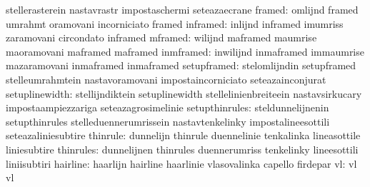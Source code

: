                                   stellerasterein                  nastavrastr
                                  impostaschermi                   seteazaecrane
                          framed: omlijnd                          framed
                                  umrahmt                          oramovani
                                  incorniciato                     framed
                        inframed: inlijnd                          inframed
                                  imumriss                         zaramovani
                                  circondato                       inframed
                         mframed: wilijnd                          maframed
                                  maumrise                         maoramovani
                                  maframed                         maframed
                       inmframed: inwilijnd                        inmaframed
                                  immaumrise                       mazaramovani
                                  inmaframed                       inmaframed
                     setupframed: stelomlijndin                    setupframed
                                  stelleumrahmtein                 nastavoramovani
                                  impostaincorniciato              seteazainconjurat
                  setuplinewidth: stellijndiktein                  setuplinewidth
                                  stellelinienbreiteein            nastavsirkucary
                                  impostaampiezzariga              seteazagrosimelinie
                  setupthinrules: steldunnelijnenin                setupthinrules
                                  stelleduennerumrissein           nastavtenkelinky
                                  impostalineesottili              seteazaliniesubtire
                        thinrule: dunnelijn                        thinrule
                                  duennelinie                      tenkalinka
                                  lineasottile                     liniesubtire
                       thinrules: dunnelijnen                      thinrules
                                  duennerumriss                    tenkelinky
                                  lineesottili                     liniisubtiri
                        hairline: haarlijn                         hairline
                                  haarlinie                        vlasovalinka
                                  capello                          firdepar
                              vl: vl                               vl
